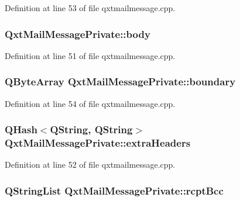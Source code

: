 Definition at line 53 of file qxtmailmessage.\-cpp.

\hypertarget{struct_qxt_mail_message_private_aa44931c7c2e5e0873a3c6c5ddd6bf530}{
\subsubsection[{body}]{ Qxt\-Mail\-Message\-Private\-::body}}\label{struct_qxt_mail_message_private_aa44931c7c2e5e0873a3c6c5ddd6bf530}


Definition at line 51 of file qxtmailmessage.\-cpp.

\hypertarget{struct_qxt_mail_message_private_ac8ae478d215963c6834c1c413abb9b69}{
\subsubsection[{boundary}]{\setlength{\rightskip}{0pt plus 5cm}Q\-Byte\-Array Qxt\-Mail\-Message\-Private\-::boundary\hspace{0.3cm}{\ttfamily [mutable]}}}\label{struct_qxt_mail_message_private_ac8ae478d215963c6834c1c413abb9b69}


Definition at line 54 of file qxtmailmessage.\-cpp.

\hypertarget{struct_qxt_mail_message_private_aea674d61ebec8764d6d8ec62fbdb23f2}{
\subsubsection[{extra\-Headers}]{\setlength{\rightskip}{0pt plus 5cm}Q\-Hash$<${\bf Q\-String}, {\bf Q\-String}$>$ Qxt\-Mail\-Message\-Private\-::extra\-Headers}}\label{struct_qxt_mail_message_private_aea674d61ebec8764d6d8ec62fbdb23f2}


Definition at line 52 of file qxtmailmessage.\-cpp.

\hypertarget{struct_qxt_mail_message_private_ae0915964b3ff04c0e519d1296676f859}{
\subsubsection[{rcpt\-Bcc}]{\setlength{\rightskip}{0pt plus 5cm}Q\-String\-List Qxt\-Mail\-Message\-Private\-::rcpt\-Bcc}}\label{struct_qxt_mail_message_private_ae0915964b3ff04c0e519d1296676f859}


